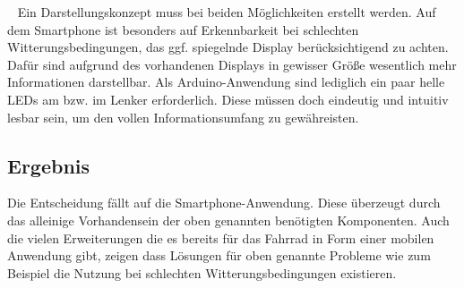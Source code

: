 \begin{description}[leftmargin=0.7cm,style=nextline]
  \item[Darstellung] ~ Ein Darstellungskonzept muss bei beiden Möglichkeiten erstellt werden. Auf dem \gls{Smartphone} ist besonders auf Erkennbarkeit bei schlechten Witterungsbedingungen, das ggf. spiegelnde Display berücksichtigend zu achten. Dafür sind aufgrund des vorhandenen Displays in gewisser Größe wesentlich mehr Informationen darstellbar. Als \gls{Arduino}-Anwendung sind lediglich ein paar helle \glspl{LED} am bzw. im Lenker erforderlich. Diese müssen doch eindeutig und intuitiv lesbar sein, um den vollen Informationsumfang zu gewähreisten.\\
\end{description}
\subsection*{Ergebnis}  
Die Entscheidung fällt auf die \gls{Smartphone}-Anwendung. Diese überzeugt durch das alleinige Vorhandensein der oben genannten benötigten Komponenten. Auch die vielen Erweiterungen die es bereits für das Fahrrad in Form einer mobilen Anwendung gibt, zeigen dass Lösungen für oben genannte Probleme wie zum Beispiel die Nutzung bei schlechten Witterungsbedingungen existieren.
